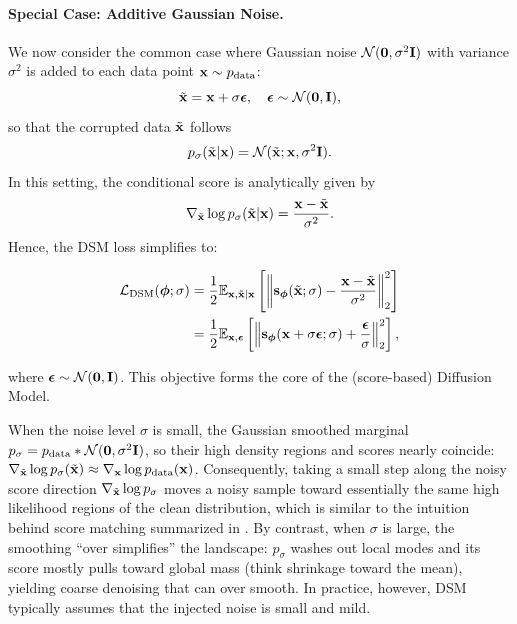 \paragraph{Special Case: Additive Gaussian Noise.} We now consider the common case where Gaussian noise $\mathcal{N}(\mathbf{0}, \sigma^2 {\mathbf{I}})$ with variance $\sigma^2$ is added to each data point ${\mathbf{x}} \sim p_{\text{data}}$:
\[
\tilde{{\mathbf{x}}} = {\mathbf{x}} + \sigma \bm{\epsilon}, \quad \bm{\epsilon} \sim \mathcal{N}(\mathbf{0}, {\mathbf{I}}),
\]
so that the corrupted data $\tilde{{\mathbf{x}}}$ follows
\[
p_{\sigma}(\tilde{{\mathbf{x}}}|{\mathbf{x}}) = \mathcal{N}(\tilde{{\mathbf{x}}}; {\mathbf{x}}, \sigma^2 {\mathbf{I}}).
\]
In this setting, the conditional score is analytically given by
\[
\nabla_{\tilde{{\mathbf{x}}}} \log p_{\sigma}(\tilde{{\mathbf{x}}}|{\mathbf{x}}) = \frac{{\mathbf{x}} - \tilde{{\mathbf{x}}}}{\sigma^2}.
\]
Hence, the DSM loss simplifies to:
\begin{mdframed}
\begin{align}\label{eq:gaussian-dsm}
\begin{aligned}
    \mathcal{L}_{\text{DSM}}(\bm{\phi}; \sigma) &= \frac{1}{2} \mathbb{E}_{{\mathbf{x}}, \tilde{{\mathbf{x}}}|{\mathbf{x}}} \left[ \left\lVert{\mathbf{s}}_{\bm{\phi}}(\tilde{{\mathbf{x}}}; \sigma) - \frac{{\mathbf{x}} - \tilde{{\mathbf{x}}}}{\sigma^2}\right\rVert_2^2 \right] \\
    &= \frac{1}{2} \mathbb{E}_{{\mathbf{x}}, \bm{\epsilon}} \left[ \left\lVert{\mathbf{s}}_{\bm{\phi}}({\mathbf{x}} + \sigma \bm{\epsilon}; \sigma) + \frac{\bm{\epsilon}}{\sigma}\right\rVert_2^2 \right],
\end{aligned}
\end{align}
\end{mdframed}
where $\bm{\epsilon} \sim \mathcal{N}(\mathbf{0}, {\mathbf{I}})$. This objective forms the core of the (score-based) Diffusion Model. 



When the noise level $\sigma$ is small, the Gaussian smoothed marginal 
$p_\sigma = p_{\mathrm{data}} * \mathcal{N}(\bm{0},\sigma^2 {\mathbf{I}})$, 
so their high density regions and scores nearly coincide: 
$\nabla_{\tilde{{\mathbf{x}}}} \log p_\sigma(\tilde{{\mathbf{x}}}) \approx \nabla_{\mathbf{x}} \log p_{\mathrm{data}}({\mathbf{x}})$. 
Consequently, taking a small step along the noisy score direction 
$\nabla_{\tilde{{\mathbf{x}}}} \log p_\sigma$ moves a noisy sample toward essentially the same 
high likelihood regions of the clean distribution, which is similar to the intuition 
behind score matching summarized in . 
By contrast, when $\sigma$ is large, the smoothing ``over simplifies'' the landscape: 
$p_\sigma$ washes out local modes and its score mostly pulls toward global mass 
(think shrinkage toward the mean), yielding coarse denoising that can over smooth. 
In practice, however, DSM typically assumes that the injected noise is small and mild.


